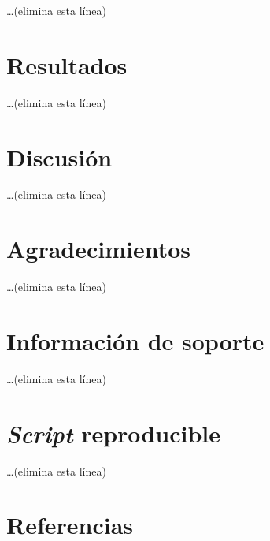\documentclass[11pt,]{article}
\begin{document}
\ldots (elimina esta línea)

\hypertarget{resultados}{%
\section{Resultados}\label{resultados}}

\ldots (elimina esta línea)

\hypertarget{discusiuxf3n}{%
\section{Discusión}\label{discusiuxf3n}}

\ldots (elimina esta línea)

\hypertarget{agradecimientos}{%
\section{Agradecimientos}\label{agradecimientos}}

\ldots (elimina esta línea)

\hypertarget{informaciuxf3n-de-soporte}{%
\section{Información de soporte}\label{informaciuxf3n-de-soporte}}

\ldots (elimina esta línea)

\hypertarget{script-reproducible}{%
\section{\texorpdfstring{\emph{Script}
reproducible}{Script reproducible}}\label{script-reproducible}}

\ldots (elimina esta línea)

\hypertarget{referencias}{%
\section{Referencias}\label{referencias}}





\newpage
\singlespacing
\end{document}
